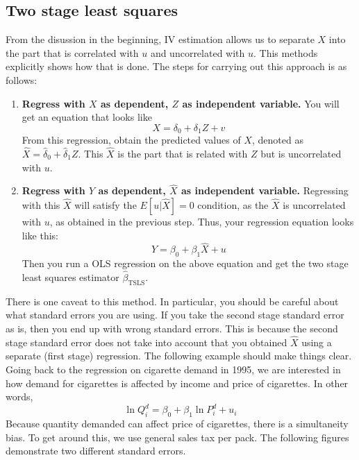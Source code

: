 \subsection{Two stage least squares} %
From the disussion in the beginning, IV estimation allows us to separate $X$ into the part that is correlated with $u$ and uncorrelated with $u$. This methods explicitly shows how that is done. The steps for carrying out this approach is as follows:
\begin{enumerate}
\item \textbf{Regress with $X$ as dependent, $Z$ as independent variable.} You will get an equation that looks like
\[
X=\delta_0 + \delta_1Z+v
\]
From this regression, obtain the predicted values of $X$, denoted as $\hat{X}=\hat{\delta}_0+\hat{\delta}_1Z$. This $\hat{X}$ is the part that is related with $Z$ but is uncorrelated with $u$.
\item \textbf{Regress with $Y$ as dependent, $\hat{X}$ as independent variable.} Regressing with this $\hat{X}$ will satisfy the $E[u|\hat{X}]=0$ condition, as the $\hat{X}$ is uncorrelated with $u$, as obtained in the previous step. Thus, your regression equation looks like this:
\[
Y=\beta_0+\beta_1\hat{X}+u
\]
Then you run a OLS regression on the above equation and get the two stage least squares estimator $\hat{\beta}_{\text{TSLS}}$. 
\end{enumerate} \par\medskip
There is one caveat to this method. In particular, you should be careful about what standard errors you are using. If you take the second stage standard error as is, then you end up with wrong standard errors. This is because the second stage standard error does not take into account that you obtained $\hat{X}$ using a separate (first stage) regression. The following example should make things clear. Going back to the regression on cigarette demand in 1995, we are interested in how demand for cigarettes is affected by income and price of cigarettes. In other words,
\[
\ln{Q_i^d}=\beta_0+\beta_1\ln{P_i^d}+u_i
\]
Because quantity demanded can affect price of cigarettes, there is a simultaneity bias. To get around this, we use general sales tax per pack. The following figures demonstrate two different standard errors.
